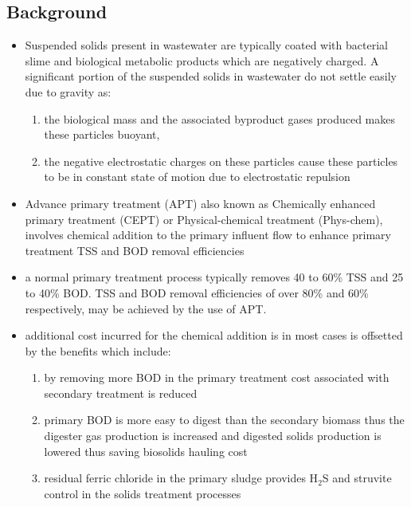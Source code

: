 \subsection{Background}     
      
        \begin{itemize}
			\item Suspended solids present in wastewater are typically coated with bacterial slime and biological metabolic products which are negatively charged.  A significant portion of the suspended solids in wastewater do not settle easily due to gravity as:
				\begin{enumerate}
					\item the biological mass and the associated byproduct gases produced makes these particles buoyant, 
					\item the negative electrostatic charges on these particles cause these particles to be in constant state of motion due to electrostatic repulsion
				\end{enumerate}
			\item Advance primary treatment (APT) also known as Chemically enhanced primary treatment (CEPT) or Physical-chemical treatment (Phys-chem), involves chemical addition to the primary influent flow to enhance primary treatment TSS and BOD removal efficiencies
			\item a normal primary treatment process typically removes 40 to 60\% TSS and 25 to 40\% BOD.  TSS and BOD removal efficiencies of over 80\% and 60\% respectively, may be achieved by the use of APT.
			\item additional cost incurred for the chemical addition is in most cases is offsetted by the benefits which include:
				\begin{enumerate}
					\item by removing more BOD in the primary treatment cost associated with secondary treatment is reduced
					\item primary BOD is more easy to digest than the secondary biomass thus the digester gas production is increased and digested solids production is lowered thus saving biosolids hauling cost
					\item residual ferric chloride in the primary sludge provides H$_2$S and struvite control in the solids treatment processes  
				\end{enumerate}
		\end{itemize}
\vspace{0.4 cm}

